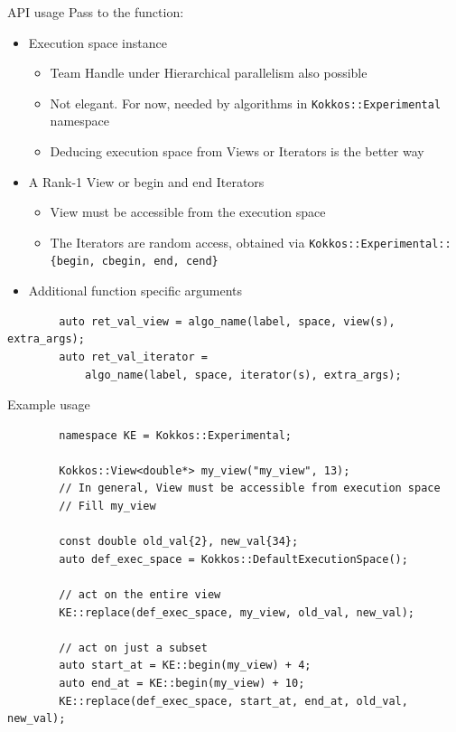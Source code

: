 \documentclass[
    aspectratio=169,
]{beamer}
\begin{document}
\begin{frame}[fragile]{API usage}
    Pass to the function:
    \begin{itemize}
        \item Execution space instance
        \begin{itemize}
            \item Team Handle under Hierarchical parallelism also possible
            \item Not elegant. For now, needed by algorithms in \texttt{Kokkos::Experimental} namespace
            \item Deducing execution space from Views or Iterators is the better way
        \end{itemize}
        \item A Rank-1 View or begin and end Iterators
        \begin{itemize}
            \item View must be accessible from the execution space
            \item The Iterators are random access, obtained via \texttt{Kokkos::Experimental::\{begin, cbegin, end, cend\}}
        \end{itemize}
        \item Additional function specific arguments
    \end{itemize}
    \begin{verbatim}
        auto ret_val_view = algo_name(label, space, view(s), extra_args);
        auto ret_val_iterator =
            algo_name(label, space, iterator(s), extra_args);
    \end{verbatim}
\end{frame}

\begin{frame}[fragile]{Example usage}
    \begin{verbatim}
        namespace KE = Kokkos::Experimental;

        Kokkos::View<double*> my_view("my_view", 13);
        // In general, View must be accessible from execution space
        // Fill my_view

        const double old_val{2}, new_val{34};
        auto def_exec_space = Kokkos::DefaultExecutionSpace();

        // act on the entire view
        KE::replace(def_exec_space, my_view, old_val, new_val);

        // act on just a subset
        auto start_at = KE::begin(my_view) + 4;
        auto end_at = KE::begin(my_view) + 10;
        KE::replace(def_exec_space, start_at, end_at, old_val, new_val);
    \end{verbatim}
\end{frame}
\end{document}
